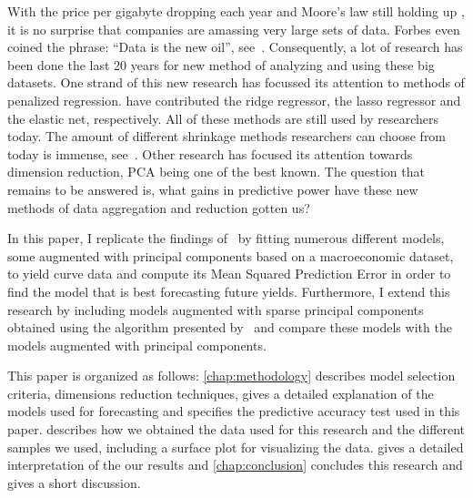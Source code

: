 With the price per gigabyte dropping each year and Moore's law still holding up \parencite{schaller_moores_1997}, it is no surprise that companies are amassing very large sets of data. Forbes even coined the phrase: \enquote{Data is the new oil}, see~\textcite{bhageshpur_council_2019}. Consequently, a lot of research has been done the last 20 years for new method of analyzing and using these big datasets. One strand of this new research has focussed its attention to methods of penalized regression. \Textcite{bell_solutions_1978,tibshirani_regression_1996,zou_regularization_2005} have contributed the ridge regressor, the lasso regressor and the elastic net, respectively. All of these methods are still used by researchers today. The amount of different shrinkage methods researchers can choose from today is immense, see~\textcite{bai_forecasting_2008,bai_boosting_2009,schumacher_factor_2010,stock_generalized_2012,kim_forecasting_2014,kim_mining_2018,hirano_forecasting_2017}. Other research has focused its attention towards dimension reduction, PCA being one of the best known. The question that remains to be answered is, what gains in predictive power have these new methods of data aggregation and reduction gotten us? 

In this paper, I replicate the findings of~\textcite{swanson_big_2017} by fitting numerous different models, some augmented with principal components based on a macroeconomic dataset, to yield curve data and compute its Mean Squared Prediction Error in order to find the model that is best forecasting future yields. Furthermore, I extend this research by including models augmented with sparse principal components obtained using the algorithm presented by~\textcite{zou_sparse_2006} and compare these models with the models augmented with principal components. 

This paper is organized as follows: \cref{chap:methodology} describes model selection criteria, dimensions reduction techniques, gives a detailed explanation of the models used for forecasting and specifies the predictive accuracy test used in this paper.  describes how we obtained the data used for this research and the different samples we used, including a surface plot for visualizing the data.  gives a detailed interpretation of the our results and \cref{chap:conclusion} concludes this research and gives a short discussion. 